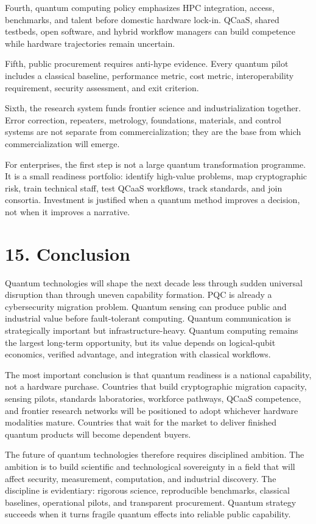 \documentclass[
  11pt,
  letterpaper,
]{article}
\begin{document}
Fourth, quantum computing policy emphasizes HPC integration, access,
benchmarks, and talent before domestic hardware lock-in. QCaaS, shared
testbeds, open software, and hybrid workflow managers can build
competence while hardware trajectories remain uncertain.

Fifth, public procurement requires anti-hype evidence. Every quantum
pilot includes a classical baseline, performance metric, cost metric,
interoperability requirement, security assessment, and exit criterion.

Sixth, the research system funds frontier science and industrialization
together. Error correction, repeaters, metrology, foundations,
materials, and control systems are not separate from commercialization;
they are the base from which commercialization will emerge.

For enterprises, the first step is not a large quantum transformation
programme. It is a small readiness portfolio: identify high-value
problems, map cryptographic risk, train technical staff, test QCaaS
workflows, track standards, and join consortia. Investment is justified
when a quantum method improves a decision, not when it improves a
narrative.

\section{15. Conclusion}\label{conclusion}

Quantum technologies will shape the next decade less through sudden
universal disruption than through uneven capability formation. PQC is
already a cybersecurity migration problem. Quantum sensing can produce
public and industrial value before fault-tolerant computing. Quantum
communication is strategically important but infrastructure-heavy.
Quantum computing remains the largest long-term opportunity, but its
value depends on logical-qubit economics, verified advantage, and
integration with classical workflows.

The most important conclusion is that quantum readiness is a national
capability, not a hardware purchase. Countries that build cryptographic
migration capacity, sensing pilots, standards laboratories, workforce
pathways, QCaaS competence, and frontier research networks will be
positioned to adopt whichever hardware modalities mature. Countries that
wait for the market to deliver finished quantum products will become
dependent buyers.

The future of quantum technologies therefore requires disciplined
ambition. The ambition is to build scientific and technological
sovereignty in a field that will affect security, measurement,
computation, and industrial discovery. The discipline is evidentiary:
rigorous science, reproducible benchmarks, classical baselines,
operational pilots, and transparent procurement. Quantum strategy
succeeds when it turns fragile quantum effects into reliable public
capability.
\end{document}
